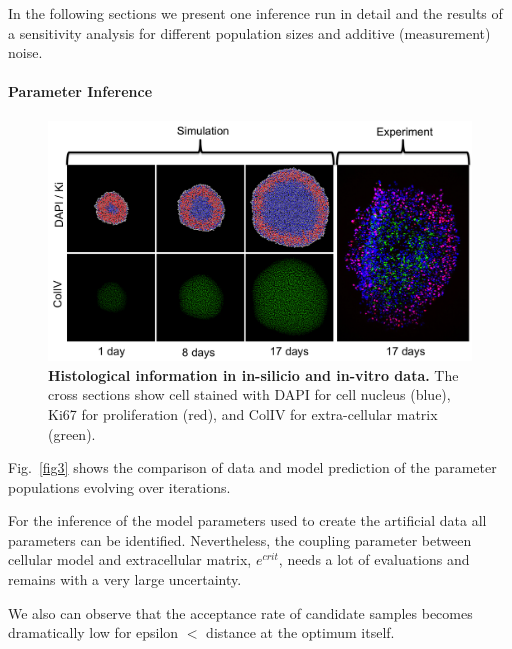 \documentclass[10pt,letterpaper]{article}
\begin{document}
In the following sections we present one inference run in detail and the results of a sensitivity analysis for different population sizes and additive (measurement) noise. 

\paragraph{Parameter Inference}


\begin{figure}[!h]
\includegraphics[width=\textwidth]{Figures/SimulationSnapshots}
\caption{{\bf Histological information in in-silicio and in-vitro data.}
The cross sections show cell stained with DAPI for cell nucleus (blue), Ki67 for proliferation (red), and ColIV  for extra-cellular matrix (green).}
\label{fig2}
\end{figure}



Fig.~\ref{fig3} shows the comparison of data and model prediction of the parameter populations evolving over iterations.

For the inference of the model parameters used to create the artificial data all parameters can be identified. Nevertheless, the coupling parameter between cellular model and extracellular matrix, $e^{crit}$, needs a lot of evaluations and remains with a very large uncertainty. 

We also can observe that the acceptance rate of candidate samples becomes dramatically low for epsilon $<$ distance at the optimum itself.
\end{document}
